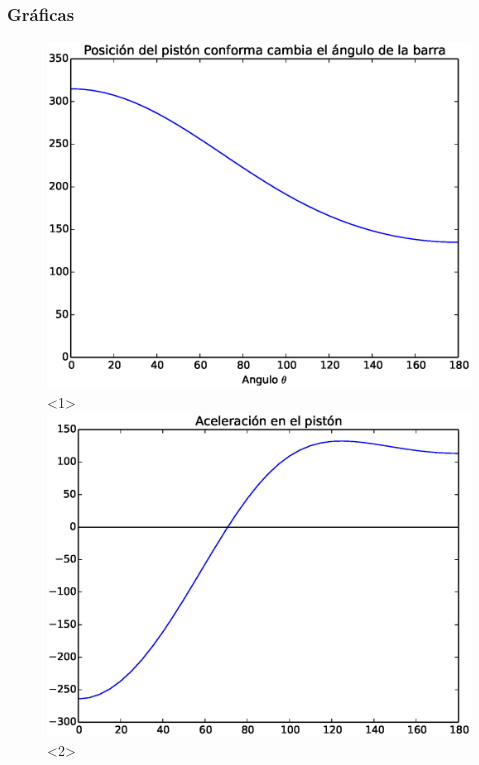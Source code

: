 \begin{frame}[fragile]
\frametitle{Gráficas}
\begin{figure}
\centering
\includegraphics[scale=0.5]{Imagenes/Examen_2015_2_p3_01.eps}<1> 
\includegraphics[scale=0.5]{Imagenes/Examen_2015_2_p3_02.eps}<2>
\end{figure}
\end{frame}
